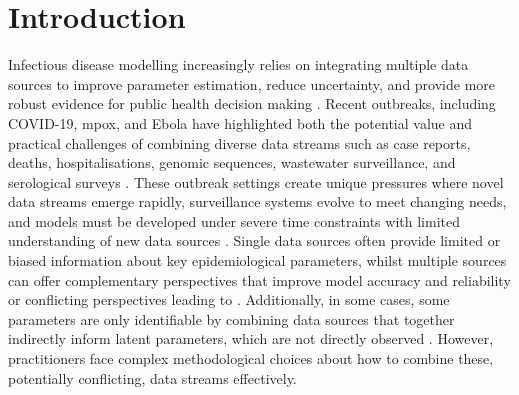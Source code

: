 \documentclass{article}
\begin{document}
\section{Introduction}

Infectious disease modelling increasingly relies on integrating multiple data sources to improve parameter estimation, reduce uncertainty, and provide more robust evidence for public health decision making \citep{deangelis2018analysing}.
Recent outbreaks, including COVID-19, mpox, and Ebola have highlighted both the potential value and practical challenges of combining diverse data streams such as case reports, deaths, hospitalisations, genomic sequences, wastewater surveillance, and serological surveys \citep{knock2021key, ro2025estimating, Abbott2021-delta, Abbott2022-prevalence, Ward2024-sp,birrell2025real}.
These outbreak settings create unique pressures where novel data streams emerge rapidly, surveillance systems evolve to meet changing needs, and models must be developed under severe time constraints with limited understanding of new data sources \citep{mccaw2023role}.
Single data sources often provide limited or biased information about key epidemiological parameters, whilst multiple sources can offer complementary perspectives that improve model accuracy and reliability or conflicting perspectives leading to  \citep{lison2024generative, sherratt2021exploring}.
Additionally, in some cases, some parameters are only identifiable by combining data sources that together indirectly inform latent parameters, which are not directly observed \citep{deangelis2018analysing}.
However, practitioners face complex methodological choices about how to combine these, potentially conflicting, data streams effectively.
\end{document}
